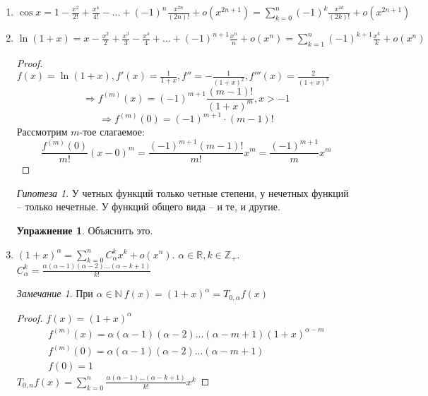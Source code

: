 \documentclass[12pt]{article}
\newenvironment{MyList}[1][4pt]{
  \begin{enumerate}[1.]
  \setlength{\parskip}{0pt}
  \setlength{\itemsep}{#1}
}{       
  \end{enumerate}
}
\def\N{\mathbb{N}}       %
\def\R{\mathbb{R}}       %
\def\Z{\mathbb{Z}}       %
\def\SO{\Rightarrow}     %
\theoremstyle{definition} %
\newtheorem{Ex}[Thm]{Упражнение} %
\theoremstyle{plain} %
\theoremstyle{remark} %
\newtheorem{Conj}[Thm]{Гипотеза} %
\newtheorem{Rem}[Thm]{Замечание} %
\begin{document}
\begin{MyList}
    \item $\cos x = 1 - \frac{x^2}{2!} + \frac{x^4}{4!} - ... + (-1)^n \frac{x^{2n}}{(2n)!} + o(x^{2n + 1}) = \sum_{k=0}^{n} (-1)^k \frac{x^{2k}}{(2k)!} + o(x^{2n + 1})$ 
    \item $\ln (1 + x) = x - \frac{x^2}{2} + \frac{x^3}{3} - \frac{x^4}{4} + ... + (-1)^{n + 1} \frac{x^n}{n} + o(x^n) = \sum_{k=1}^{n} (-1)^{k + 1} \frac{x^k}{k} + o(x^n)$ 
    \begin{proof}
        $f(x) = \ln(1 + x), f'(x) = \frac{1}{1 + x}, f'' = -\frac{1}{(1 + x)^2}, f'''(x) = \frac{2}{(1 + x)^3}$
        \[\SO f^{(m)}(x) = (-1)^{m + 1} \frac{(m - 1)!}{(1 + x)^m}, x > -1\]
        \[\SO f^{(m)}(0) = (-1)^{m + 1} \cdot (m - 1)!\]
        Рассмотрим $m$-тое слагаемое:
        \[ \frac{f^{(m)}(0)}{m!}(x - 0)^m = \frac{(-1)^{m + 1}(m - 1)!}{m!}x^m = \frac{(-1)^{m + 1}}{m}x^m\] 
    \end{proof}

    \begin{Conj}
        У четных функций только четные степени, у нечетных функций -- только нечетные.
        У функций общего вида -- и те, и другие.
    \end{Conj}

    \begin{Ex}
        Объяснить это.
    \end{Ex}

    \item $(1 + x)^\alpha = \sum_{k=0}^{n} C_\alpha^k x^k + o(x^n)$. $\alpha \in \R, k \in \Z_+$. $C_\alpha^k = \frac{\alpha (\alpha - 1)(\alpha - 2) ... (\alpha - k + 1)}{k!}$ \\
    \begin{Rem}
        При $\alpha \in \N \ f(x) = (1 + x)^\alpha = T_{0, \alpha} f(x)$ 
    \end{Rem}

    \begin{proof}
        $f(x) = (1 + x)^\alpha$ 
        \begin{gather*}
            f^{(m)}(x) = \alpha (\alpha - 1) (\alpha - 2) ... (\alpha - m + 1)(1 + x)^{\alpha - m} \\
            f^{(m)}(0) = \alpha (\alpha - 1)(\alpha - 2) ... (\alpha - m + 1) \\
            f(0) = 1
        \end{gather*}
        $T_{0, n} f(x) = \sum_{k=0}^{n} \frac{\alpha (\alpha - 1) ... (\alpha - k + 1)}{k!}x^k$ 
    \end{proof}
\end{MyList}
\end{document}

